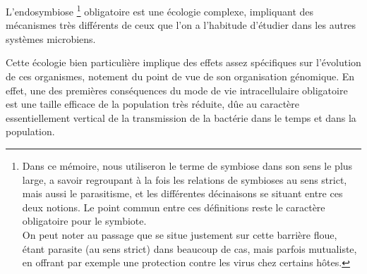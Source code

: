 


L’endosymbiose%
\footnote{Dans ce mémoire, nous utiliseron le terme de symbiose dans son sens le plus large, a savoir regroupant à la fois les relations de symbioses au sens strict, mais aussi le parasitisme, et les différentes décinaisons se situant entre ces deux notions. Le point commun entre ces définitions reste le caractère obligatoire pour le symbiote.\\
On peut noter au passage que  se situe justement sur cette barrière floue, étant parasite (au sens strict) dans beaucoup de cas, mais parfois mutualiste, en offrant par exemple une protection contre les virus chez certains hôtes.}
obligatoire est une écologie complexe, impliquant des mécanismes très différents de ceux que l’on a l’habitude d’étudier dans les autres systèmes microbiens.

Cette écologie bien particulière implique des effets assez spécifiques sur l'évolution de ces organismes, notement du point de vue de son organisation génomique.
En effet, une des premières conséquences du mode de vie intracellulaire obligatoire est une taille efficace de la population très réduite, dûe au caractère essentiellement vertical de la transmission de la bactérie dans le temps et dans la population.

